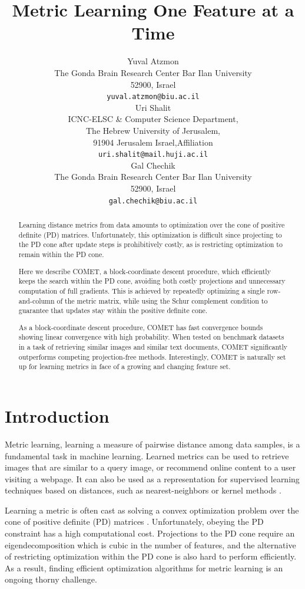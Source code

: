 \documentclass{article} %
\title{Metric Learning One Feature at a Time}
\author{
Yuval Atzmon \\
The Gonda Brain Research Center
Bar Ilan University\\
52900, Israel\\
\texttt{yuval.atzmon@biu.ac.il} \\
\And
Uri Shalit \\
ICNC-ELSC & Computer Science Department, \\
The Hebrew University of Jerusalem, \\
91904 Jerusalem Israel,Affiliation \\
\texttt{uri.shalit@mail.huji.ac.il} \\
\AND
Gal Chechik \\
The Gonda Brain Research Center
Bar Ilan University\\
52900, Israel\\
\texttt{gal.chechik@biu.ac.il}
}
\newcommand{\R}{\mathbb{R}}
\newcommand{\ignore}[1]{}
\begin{document}
\maketitle
\vspace{-20pt}
\begin{abstract} 
Learning distance metrics from data amounts to optimization over the cone of positive definite (PD) matrices. Unfortunately, this optimization is difficult since projecting to the PD cone after update steps is prohibitively costly, as is restricting optimization to remain within the PD cone.

Here we describe COMET, a block-coordinate descent procedure, which efficiently keeps the search within the PD cone, avoiding both costly projections and unnecessary computation of full gradients. This is achieved by repeatedly optimizing a single row-and-column of the metric matrix, while using the Schur complement condition to guarantee that updates stay within the positive definite cone. 

As a block-coordinate descent procedure, COMET has fast convergence bounds showing linear convergence with high probability. When tested on benchmark datasets in a task of retrieving similar images and similar text documents, COMET significantly outperforms competing projection-free methods. Interestingly, COMET is naturally set up for learning metrics in face of a growing and changing feature set.
\end{abstract} 

\section{Introduction}
Metric learning, learning a measure of pairwise distance among data samples, is a fundamental task in machine learning. Learned metrics can be used to retrieve images that are similar to a query image, or recommend online content to a user visiting a webpage. It can also be used as a representation for supervised learning techniques based on distances, such as nearest-neighbors or kernel methods \cite{kulis2012survey}. 

Learning a metric is often cast as solving a convex optimization problem over the cone of positive definite (PD) matrices\ignore{ by optimizing a similarity measure $sim_W (x,y) = x^\top W y$ s.t. $W \in \R^{d \times d}$ is a PD matrix} \cite{kulis2012survey,bellet2013survey}. Unfortunately, obeying the PD constraint has a high computational cost. Projections to the PD cone require an eigendecomposition which is cubic in the number of features, and the alternative of restricting optimization within the PD cone is also hard to perform efficiently. As a result, finding efficient optimization algorithms for metric learning is an ongoing thorny challenge. 
\end{document}
